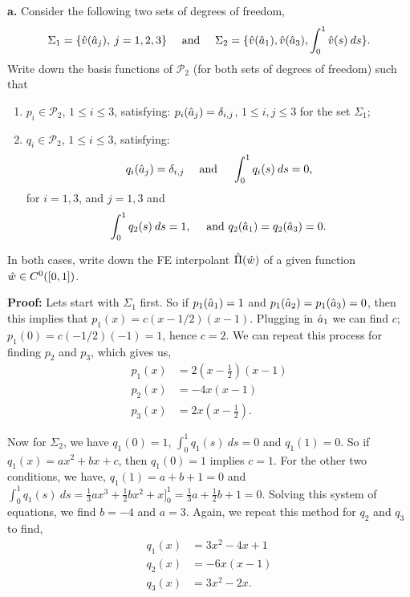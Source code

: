 \documentclass[11pt]{article}
\begin{document}
\vskip 1cm 


\textbf{a.} Consider the following two sets of degrees of freedom,
\begin{equation}
    \Sigma_1 = \{ \Hat{v}(\Hat{a}_j), \: j = 1, 2, 3 \} \quad \text{ and } \quad \Sigma_2 = \{ \Hat{v}(\Hat{a}_1), \Hat{v}(\Hat{a}_3), \int_0^1 \Hat{v}(s) \: ds \}.
\end{equation}
Write down the basis functions of $\mathcal{P}_2$ (for both sets of degrees of freedom) such that
\begin{enumerate}
    \item $p_i \in \mathcal{P}_2$, $1 \leq i \leq 3$, satisfying: $p_i(\Hat{a}_j) = \delta_{i,j}$, $1 \leq i, j \leq 3$ for the set $\Sigma_1$;
    \item $q_i \in \mathcal{P}_2$, $1 \leq i \leq 3$, satisfying:
    \begin{equation}
        q_i(\Hat{a}_j) = \delta_{i,j} \quad \text{ and } \quad \int_0^1 q_i(s) \: ds = 0, 
    \end{equation}
    for $i = 1, 3$, and $j = 1, 3$ and 
    \begin{equation}
        \int_0^1 q_2(s) \: ds = 1, \quad \text{ and } q_2(\Hat{a}_1) = q_2(\Hat{a}_3) = 0.
    \end{equation}
\end{enumerate}
In both cases, write down the FE interpolant $\Hat{\Pi}(\Hat{w})$ of a given function $\Hat{w} \in C^0([0,1])$.

\vskip 1cm

\textbf{Proof:} Lets start with $\Sigma_1$ first. 
So if $p_1(\Hat{a}_1) = 1$ and $p_1(\Hat{a}_2) = p_1(\Hat{a}_3) = 0$, then this implies that $p_1(x) = c(x - 1/2)(x-1)$.
Plugging in $\Hat{a}_1$ we can find $c$; $p_1(0) = c(-1/2)(-1) = 1$, hence $c = 2$. 
We can repeat this process for finding $p_2$ and $p_3$, which gives us,
\begin{align*}
    p_1(x) &= 2(x - \frac{1}{2})(x - 1) \\ 
    p_2(x) &= -4x(x-1) \\
    p_3(x) &= 2x(x-\frac{1}{2}).
\end{align*}

Now for $\Sigma_2$, we have $q_1(0) = 1$, $\int_0^1 q_1(s) \: ds = 0$ and $q_1(1) = 0$. 
So if $q_1(x) = ax^2 + bx + c$, then $q_1(0) = 1$ implies $c = 1$.
For the other two conditions, we have, $q_1(1) = a + b + 1 = 0$ and $\int_0^1 q_1(s) \: ds = \frac{1}{3}ax^3 + \frac{1}{2}bx^2 + x ]_0^1 = \frac{1}{3}a + \frac{1}{2}b + 1 = 0$.
Solving this system of equations, we find $b = -4$ and $a = 3$.
Again, we repeat this method for $q_2$ and $q_3$ to find,
\begin{align*}
    q_1(x) &= 3x^2 - 4x + 1 \\ 
    q_2(x) &= -6 x (x - 1) \\
    q_3(x) &= 3x^2 - 2x. 
\end{align*}
\end{document}
